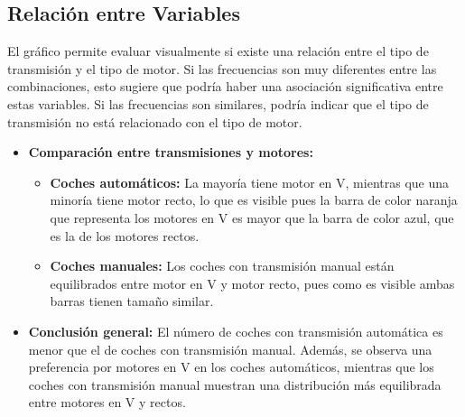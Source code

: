 \documentclass{article}
\begin{document}
\subsection{Relación entre Variables}
El gráfico permite evaluar visualmente si existe una relación entre el tipo de transmisión y el tipo de motor. Si las frecuencias son muy diferentes entre las combinaciones, esto sugiere que podría haber una asociación significativa entre estas variables. Si las frecuencias son similares, podría indicar que el tipo de transmisión no está relacionado con el tipo de motor.
\begin{itemize}
    \item \textbf{Comparación entre transmisiones y motores:}
    \begin{itemize}
        \item \textbf{Coches automáticos:} La mayoría tiene motor en V, mientras que una minoría tiene motor recto, lo que es visible pues la barra de color naranja que representa los motores en V es mayor que la barra de color azul, que es la de los motores rectos.
        \item \textbf{Coches manuales:} Los coches con transmisión manual están equilibrados entre motor en V y motor recto, pues como es visible ambas barras tienen tamaño similar.
    \end{itemize}

    \item \textbf{Conclusión general:} 
    El número de coches con transmisión automática es menor que el de coches con transmisión manual. Además, se observa una preferencia por motores en V en los coches automáticos, mientras que los coches con transmisión manual muestran una distribución más equilibrada entre motores en V y rectos.
\end{itemize}
\end{document}
